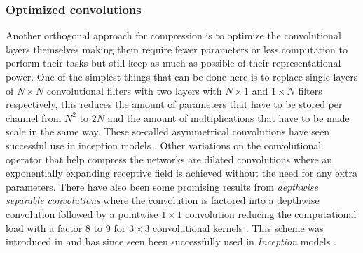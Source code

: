 \documentclass{kththesis}
\newcommand{\bibentry}[1]{\parencite{#1}}
\begin{document}
\subsubsection{Optimized convolutions}
Another orthogonal approach for compression is to optimize the convolutional
layers themselves making them require fewer parameters or less computation to
perform their tasks but still keep as much as possible of their representational
power. One of the simplest things that can be done here is to replace single
layers of \(N \times N\) convolutional filters with two layers with \(N \times
1\) and \(1 \times N\) filters respectively, this reduces the amount of
parameters that have to be stored per channel from \(N^2\) to \(2N\) and the
amount of multiplications that have to be made scale in the same way. These
so-called asymmetrical convolutions have seen successful use in inception models
\bibentry{szegedy2016rethinking}.  
Other variations on the convolutional operator that help compress the networks
are dilated convolutions \bibentry{yu2015multi} where an exponentially expanding
receptive field is achieved without the need for any extra parameters. There
have also been some promising results from \emph{depthwise separable
  convolutions} where the convolution is factored into a depthwise convolution
followed by a pointwise \(1 \times 1\) convolution reducing the computational
load with a factor \(8\) to \(9\) for \(3 \times 3\) convolutional kernels
\bibentry{howard2017mobilenets}. This scheme was introduced in
\bibentry{sifre2014rigid} and has since seen been successfully used in
\emph{Inception} models \bibentry{ioffe2015batch}.  
\end{document}
